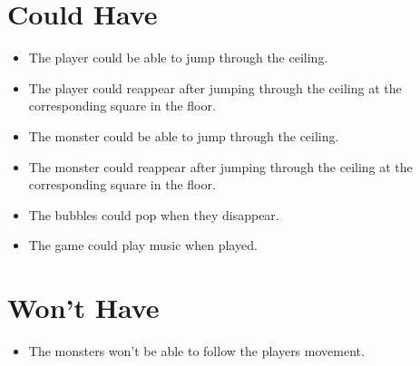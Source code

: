 \section{Could Have}
\begin{itemize}
\itemsep0em
\item The player could be able to jump through the ceiling.
\item The player could reappear after jumping through the ceiling at the corresponding square in the floor.
\item The monster could be able to jump through the ceiling.
\item The monster could reappear after jumping through the ceiling at the corresponding square in the floor.
\item The bubbles could pop when they disappear.
\item The game could play music when played.
\end{itemize}

\section{Won't Have}
\begin{itemize}
\itemsep0em
\item The monsters won't be able to follow the players movement.
\end{itemize}